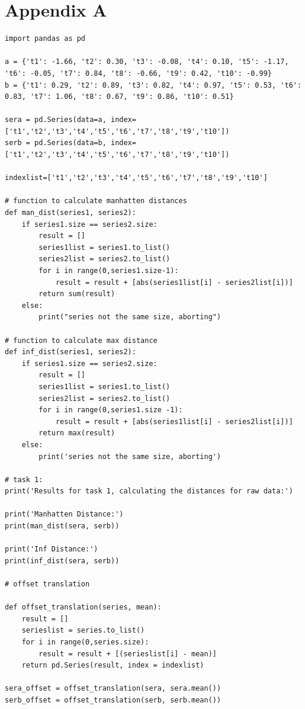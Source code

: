     \pagebreak
    \section{Appendix A}
    \label{appA}
    \begin{lstlisting}
import pandas as pd

a = {'t1': -1.66, 't2': 0.30, 't3': -0.08, 't4': 0.10, 't5': -1.17, 't6': -0.05, 't7': 0.84, 't8': -0.66, 't9': 0.42, 't10': -0.99}
b = {'t1': 0.29, 't2': 0.89, 't3': 0.82, 't4': 0.97, 't5': 0.53, 't6': 0.83, 't7': 1.06, 't8': 0.67, 't9': 0.86, 't10': 0.51}

sera = pd.Series(data=a, index=['t1','t2','t3','t4','t5','t6','t7','t8','t9','t10'])
serb = pd.Series(data=b, index=['t1','t2','t3','t4','t5','t6','t7','t8','t9','t10'])

indexlist=['t1','t2','t3','t4','t5','t6','t7','t8','t9','t10']

# function to calculate manhatten distances
def man_dist(series1, series2):
    if series1.size == series2.size:
        result = []
        series1list = series1.to_list()
        series2list = series2.to_list()
        for i in range(0,series1.size-1):
            result = result + [abs(series1list[i] - series2list[i])]
        return sum(result)
    else:
        print("series not the same size, aborting")

# function to calculate max distance
def inf_dist(series1, series2):
    if series1.size == series2.size:
        result = []
        series1list = series1.to_list()
        series2list = series2.to_list()
        for i in range(0,series1.size -1):
            result = result + [abs(series1list[i] - series2list[i])]
        return max(result)
    else:
        print('series not the same size, aborting')

# task 1:
print('Results for task 1, calculating the distances for raw data:')

print('Manhatten Distance:')
print(man_dist(sera, serb))

print('Inf Distance:')
print(inf_dist(sera, serb))

# offset translation

def offset_translation(series, mean):
    result = []
    serieslist = series.to_list()
    for i in range(0,series.size):
        result = result + [(serieslist[i] - mean)]
    return pd.Series(result, index = indexlist)

sera_offset = offset_translation(sera, sera.mean())
serb_offset = offset_translation(serb, serb.mean())


\end{lstlisting}
